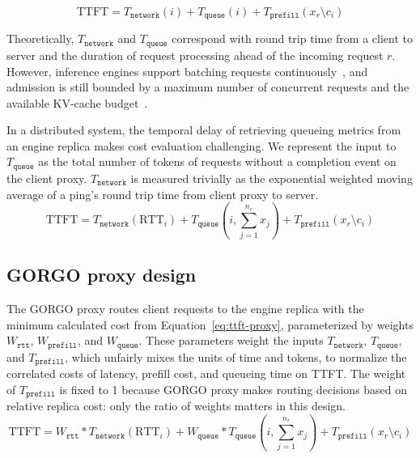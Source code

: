 \documentclass{article}
\begin{document}
\begin{equation}
\mathrm{TTFT} = T_{\texttt{network}}(i) + T_{\texttt{queue}}(i) + T_{\texttt{prefill}}(x_r \setminus c_i)
\label{eq:ttft}
\end{equation}

Theoretically, $T_{\texttt{network}}$ and $T_{\texttt{queue}}$ correspond with round trip time from a client to server and the duration of request processing ahead of the incoming request $r$. However, inference engines support batching requests continuously~\citep{orca2022}, and admission is still bounded by a maximum number of concurrent requests and the available KV-cache budget~\citep{vllm2023}.

In a distributed system, the temporal delay of retrieving queueing metrics from an engine replica makes cost evaluation challenging. We represent the input to $T_{\texttt{queue}}$ as the total number of tokens of requests without a completion event on the client proxy. $T_{\texttt{network}}$ is measured trivially as the exponential weighted moving average of a ping's round trip time from client proxy to server.
\begin{equation}
\mathrm{TTFT} = T_{\texttt{network}}(\mathrm{RTT}_i) + T_{\texttt{queue}}\left(i, \sum_{j=1}^{n_r} x_j\right) + T_{\texttt{prefill}}(x_r \setminus c_i)
\label{eq:ttft-proxy}
\end{equation}

\subsection{GORGO proxy design}

The GORGO proxy routes client requests to the engine replica with the minimum calculated cost from Equation~\ref{eq:ttft-proxy}, parameterized by weights $W_{\texttt{rtt}}$, $W_{\texttt{prefill}}$, and $W_{\texttt{queue}}$. These parameters weight the inputs $T_{\texttt{network}}$, $T_{\texttt{queue}}$, and $T_{\texttt{prefill}}$, which unfairly mixes the units of time and tokens, to normalize the correlated costs of latency, prefill cost, and queueing time on TTFT. The weight of $T_{\texttt{prefill}}$ is fixed to 1 because GORGO proxy makes routing decisions based on relative replica cost: only the ratio of weights matters in this design.
\begin{equation}
\mathrm{TTFT} = W_{\texttt{rtt}} * T_{\texttt{network}}(\mathrm{RTT}_i) + W_{\texttt{queue}} * T_{\texttt{queue}}\left(i, \sum_{j=1}^{n_r} x_j\right) + T_{\texttt{prefill}}(x_r \setminus c_i)
\label{eq:score}
\end{equation}
\end{document}
